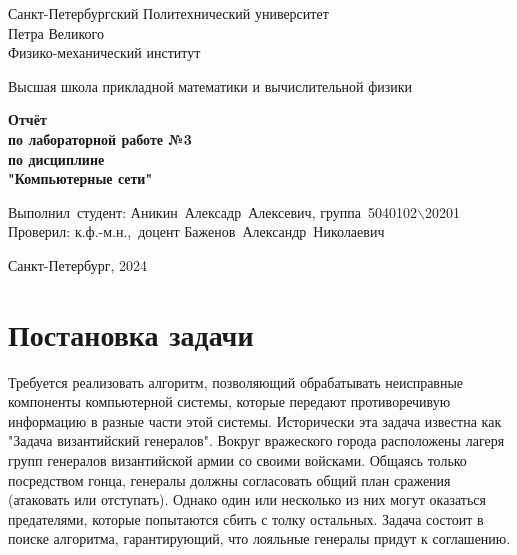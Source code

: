 \documentclass[12pt,a4paper]{article}
\begin{document}
	
	\begin{titlepage}
		
		\begin{center}
			\begin{large}
				Санкт-Петербургский Политехнический университет\\ Петра Великого\\
				Физико-механический институт\\
			\end{large}
			\vspace{0.2cm}
			Высшая школа прикладной математики и вычислительной физики\\
			
		\end{center}
		
		\vspace{3cm}
		\begin{center}
			\textbf{Отчёт\\ по лабораторной работе №3\\ по дисциплине\\ "Компьютерные сети"}
		\end{center}
		
		\vspace{3cm}
		
		\vbox{%
			\hfill%
			\vbox{%
				\hbox{Выполнил студент:}%
				\hbox{\break}
				\hbox{Аникин Алексадр Алексевич,}%
				\hbox{группа 5040102$\backslash$20201}%
				\hbox{\break}
				\hbox{\break}
				\hbox{Проверил:}
				\hbox{\break}
				\hbox{к.ф.-м.н., доцент}
				\hbox{Баженов Александр Николаевич}
			}%
		} 
		\vfill
		
		\begin{center}
			Санкт-Петербург, 2024
		\end{center}
	
	\end{titlepage}
	\tableofcontents
	\newpage
		
	\section{Постановка задачи}
        Требуется реализовать алгоритм, позволяющий обрабатывать неисправные компоненты компьютерной системы, которые передают противоречивую информацию в разные части этой системы. Исторически эта задача известна как "Задача византийский генералов".\newline \newline
        Вокруг вражеского города расположены лагеря групп генералов византийской армии со своими войсками. Общаясь только посредством гонца, генералы должны согласовать общий план сражения (атаковать или отступать). Однако один или несколько из них могут оказаться предателями, которые попытаются сбить с толку остальных. Задача состоит в поиске алгоритма, гарантирующий, что лояльные генералы придут к соглашению.
	\newpage
	
\end{document}
